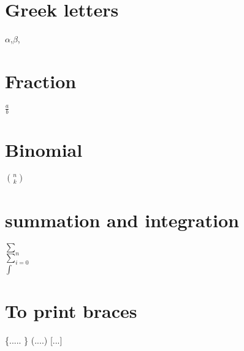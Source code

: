 \documentclass{report}
\begin{document}
\section{Greek letters}
$\alpha$,$\beta$,

\section{Fraction}
$\frac{a}{b}$

\section{Binomial}
$\binom{n}{k}$

\section{summation and integration}
$\sum$\\
$\sum_{i=0}^n$\\
$\int$\\

\section{To print braces}
\{..... \}
(....)
[...]
\end{document}

